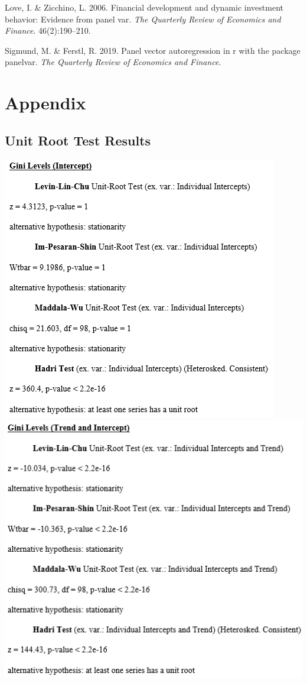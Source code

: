 \documentclass[11pt,preprint, authoryear]{elsarticle}
\numberwithin{equation}{section}
\numberwithin{figure}{section}
\numberwithin{table}{section}
\begin{document}
\leavevmode\hypertarget{ref-love}{}%
Love, I. \& Zicchino, L. 2006. Financial development and dynamic
investment behavior: Evidence from panel var. \emph{The Quarterly Review
of Economics and Finance}. 46(2):190--210.

\leavevmode\hypertarget{ref-sigmund2019panel}{}%
Sigmund, M. \& Ferstl, R. 2019. Panel vector autoregression in r with
the package panelvar. \emph{The Quarterly Review of Economics and
Finance}.

\newpage

\hypertarget{appendix}{%
\section*{Appendix}\label{appendix}}

\hypertarget{unit-root-test-results}{%
\subsection{\texorpdfstring{Unit Root Test Results
\label{A}}{Unit Root Test Results }}\label{unit-root-test-results}}

\begin{center}\includegraphics[width=0.49\linewidth,height=0.35\textheight]{images/Gini_Levels_Intercept} \includegraphics[width=0.49\linewidth,height=0.35\textheight]{images/Gini_Levels_Trend} \end{center}
\end{document}
